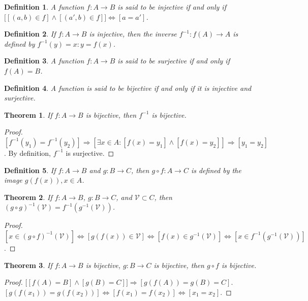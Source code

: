 \documentclass[oneside]{book}
\theoremstyle{mystyle}
\newtheorem{theorem}{Theorem}[section]
\newtheorem{definition}{Definition}[section]
\begin{document}
\begin{definition}
A function $f:A\rightarrow B$ is said to be injective if and only if $\big[[(a,b)\in f]\land[(a',b)\in f]\big]\Leftrightarrow [a=a']$.
\end{definition}

\begin{definition}
If $f:A\rightarrow B$ is injective, then the inverse $f^{-1}:f(A)\rightarrow A$ is defined by $f^{-1}(y)=x:y=f(x)$.
\end{definition}

\begin{definition}
A function $f:A\rightarrow B$ is said to be surjective if and only if $f(A) = B$.
\end{definition}

\begin{definition}
A function is said to be bijective if and only if it is injective and surjective.
\end{definition}

\begin{theorem}
If $f:A\rightarrow B$ is bijective, then $f^{-1}$ is bijective.
\end{theorem}
\begin{proof}
$[f^{-1}(y_1) = f^{-1}(y_2)]\Rightarrow [\exists x\in A:[f(x) = y_1]\land [f(x)=y_2]]\Rightarrow [y_1=y_2]$. By definition, $f^{-1}$ is surjective.
\end{proof}

\begin{definition}
If $f:A\rightarrow B$ and $g:B\rightarrow C$, then $g\circ f:A\rightarrow C$ is defined by the image $g(f(x)), x\in A$. 
\end{definition}

\begin{theorem}
If $f:A\rightarrow B$, $g:B\rightarrow C$, and $\mathcal{V}\subset C$, then $(g\circ g)^{-1}(\mathcal{V}) = f^{-1}(g^{-1}(\mathcal{V}))$.
\end{theorem}
\begin{proof}
$[x\in (g\circ f)^{-1}(\mathcal{V})]\Leftrightarrow [g(f(x))\in \mathcal{V}] \Leftrightarrow [f(x)\in g^{-1}(\mathcal{V})]\Leftrightarrow [x\in f^{-1}(g^{-1}(\mathcal{V}))]$.
\end{proof}

\begin{theorem}
If $f:A\rightarrow B$ is bijective, $g:B\rightarrow C$ is bijective, then $g\circ f$ is bijective.
\end{theorem}
\begin{proof}
$\big[[f(A) = B]\land [g(B) = C]\big]\Rightarrow [g(f(A)) = g(B) = C]$. $[g(f(x_1))=g(f(x_2))]\Leftrightarrow [f(x_1)=f(x_2)]\Leftrightarrow [x_1=x_2]$.
\end{proof}
\end{document}
